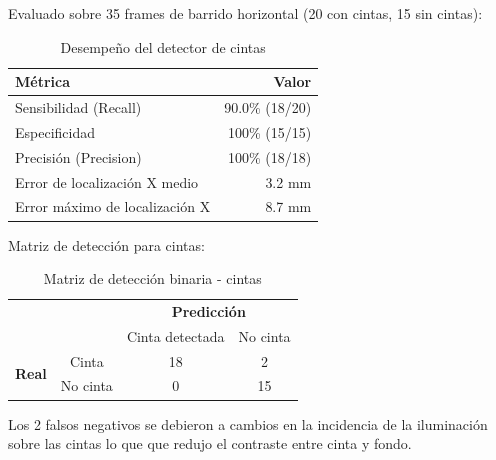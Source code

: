 Evaluado sobre 35 frames de barrido horizontal (20 con cintas, 15 sin cintas):

\begin{table}[H]
\centering
\begin{tabular}{|l|r|}
\hline
\textbf{Métrica} & \textbf{Valor} \\ \hline
Sensibilidad (Recall) & 90.0\% (18/20) \\ \hline
Especificidad & 100\% (15/15) \\ \hline
Precisión (Precision) & 100\% (18/18) \\ \hline
Error de localización X medio & 3.2 mm \\ \hline
Error máximo de localización X & 8.7 mm \\ \hline
\end{tabular}
\caption{Desempeño del detector de cintas}
\label{tab:metricas_cintas}
\end{table}

Matriz de detección para cintas:

\begin{table}[H]
\centering
\begin{tabular}{cc|c|c|}
\cline{3-4}
& & \multicolumn{2}{c|}{\textbf{Predicción}} \\ \cline{3-4}
& & Cinta detectada & No cinta \\ \hline
\multicolumn{1}{|c|}{\multirow{2}{*}{\textbf{Real}}} & Cinta & 18 & 2 \\ \cline{2-4}
\multicolumn{1}{|c|}{} & No cinta & 0 & 15 \\ \hline
\end{tabular}
\caption{Matriz de detección binaria - cintas}
\label{tab:confusion_cintas}
\end{table}

\noindent
Los 2 falsos negativos se debieron a cambios en la incidencia de la iluminación sobre las cintas lo que que redujo el contraste entre cinta y fondo.
